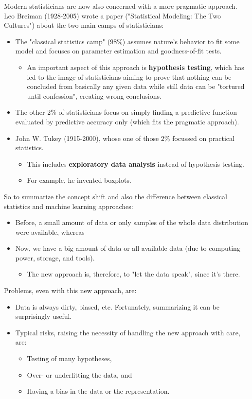Modern statisticians are now also concerned with a more pragmatic approach. Leo Breiman (1928-2005) wrote a paper ("Statistical Modeling: The Two Cultures") about the two main camps of statisticians:
\begin{itemize}
  \item The "classical statistics camp" ($98\%$) assumes nature's behavior to fit some model and focuses on parameter estimation and goodness-of-fit tests.
  \begin{itemize}
    \item An important aspect of this approach is \textbf{hypothesis testing}, which has led to the image of statisticians aiming to prove that nothing can be concluded from basically any given data while still data can be "tortured until confession", creating wrong conclusions.
  \end{itemize}
  \item The other $2\%$ of statisticians focus on simply finding a predictive function evaluated by predictive accuracy only (which fits the pragmatic approach).
  \item John W. Tukey (1915-2000), whose one of those $2\%$ focussed on practical statistics.
  \begin{itemize}
    \item This includes \textbf{exploratory data analysis} instead of hypothesis testing.
    \item For example, he invented boxplots.
  \end{itemize}
\end{itemize}

So to summarize the concept shift and also the difference between classical statistics and machine learning approaches:
\begin{itemize}
  \item Before, a small amount of data or only samples of the whole data distribution were available, whereas
  \item Now, we have a big amount of data or all available data (due to computing power, storage, and tools).
  \begin{itemize}
    \item The new approach is, therefore, to "let the data speak", since it's there.
  \end{itemize}
\end{itemize}

Problems, even with this new approach, are:
\begin{itemize}
  \item Data is always dirty, biased, etc. Fortunately, summarizing it can be surprisingly useful.
  \item Typical risks, raising the necessity of handling the new approach with care, are:
  \begin{itemize}
    \item Testing of many hypotheses,
    \item Over- or underfitting the data, and
    \item Having a bias in the data or the representation.
  \end{itemize}
\end{itemize}

